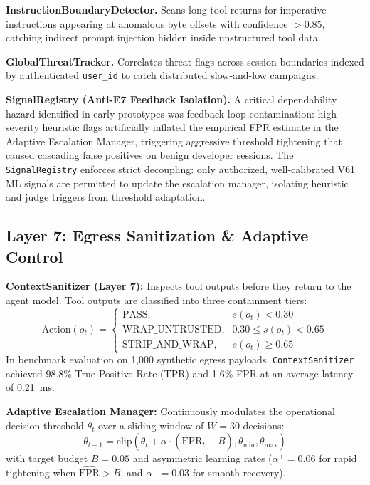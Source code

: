 \documentclass[conference]{IEEEtran}
\begin{document}
\textbf{InstructionBoundaryDetector.} Scans long tool returns for imperative instructions appearing at anomalous byte offsets with confidence $>0.85$, catching indirect prompt injection hidden inside unstructured tool data.

\textbf{GlobalThreatTracker.} Correlates threat flags across session boundaries indexed by authenticated \texttt{user\_id} to catch distributed slow-and-low campaigns.

\textbf{SignalRegistry (Anti-E7 Feedback Isolation).} A critical dependability hazard identified in early prototypes was feedback loop contamination: high-severity heuristic flags artificially inflated the empirical FPR estimate in the Adaptive Escalation Manager, triggering aggressive threshold tightening that caused cascading false positives on benign developer sessions. The \texttt{SignalRegistry} enforces strict decoupling: only authorized, well-calibrated V61 ML signals are permitted to update the escalation manager, isolating heuristic and judge triggers from threshold adaptation.

\subsection{Layer 7: Egress Sanitization \& Adaptive Control}
\textbf{ContextSanitizer (Layer 7):} Inspects tool outputs before they return to the agent model. Tool outputs are classified into three containment tiers:
\begin{equation}
\text{Action}(o_t) = 
\begin{cases}
\text{PASS}, & s(o_t) < 0.30 \\
\text{WRAP\_UNTRUSTED}, & 0.30 \leq s(o_t) < 0.65 \\
\text{STRIP\_AND\_WRAP}, & s(o_t) \geq 0.65
\end{cases}
\end{equation}
In benchmark evaluation on 1,000 synthetic egress payloads, \texttt{ContextSanitizer} achieved 98.8\% True Positive Rate (TPR) and 1.6\% FPR at an average latency of 0.21~ms.

\textbf{Adaptive Escalation Manager:} Continuously modulates the operational decision threshold $\theta_t$ over a sliding window of $W = 30$ decisions:
\begin{equation}
\theta_{t+1} = \text{clip}\left(\theta_t + \alpha \cdot (\widehat{\text{FPR}}_t - B), \theta_{\min}, \theta_{\max}\right)
\end{equation}
with target budget $B = 0.05$ and asymmetric learning rates ($\alpha^+ = 0.06$ for rapid tightening when $\widehat{\text{FPR}} > B$, and $\alpha^- = 0.03$ for smooth recovery).
\end{document}
